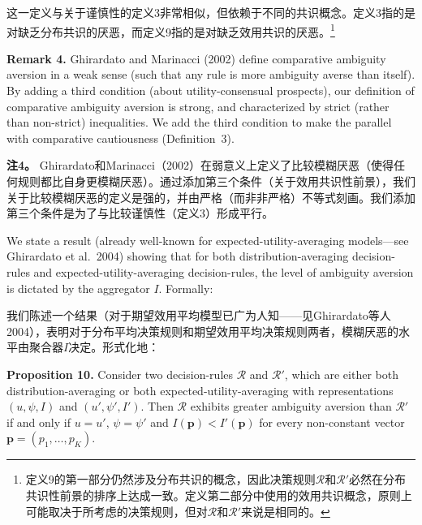 \documentclass[12pt,a4paper]{article}
\newenvironment{original}
  {\par\noindent\ignorespaces}
  {\par}
\newenvironment{translation}
  {\par\noindent{\color{transblue}\ignorespaces}}
  {\par\medskip}
\begin{document}
\begin{translation}
这一定义与关于谨慎性的定义3非常相似，但依赖于不同的共识概念。定义3指的是对缺乏分布共识的厌恶，而定义9指的是对缺乏效用共识的厌恶。\footnote{定义9的第一部分仍然涉及分布共识的概念，因此决策规则$\mathcal{R}$和$\mathcal{R}'$必然在分布共识性前景的排序上达成一致。定义第二部分中使用的效用共识概念，原则上可能取决于所考虑的决策规则，但对$\mathcal{R}$和$\mathcal{R}'$来说是相同的。}
\end{translation}

\begin{original}
\textbf{Remark 4.} Ghirardato and Marinacci (2002) define comparative ambiguity aversion in a weak sense (such that any rule is more ambiguity averse than itself). By adding a third condition (about utility-consensual prospects), our definition of comparative ambiguity aversion is strong, and characterized by strict (rather than non-strict) inequalities. We add the third condition to make the parallel with comparative cautiousness (Definition~3).
\end{original}

\begin{translation}
\textbf{注4。} Ghirardato和Marinacci（2002）在弱意义上定义了比较模糊厌恶（使得任何规则都比自身更模糊厌恶）。通过添加第三个条件（关于效用共识性前景），我们关于比较模糊厌恶的定义是强的，并由严格（而非非严格）不等式刻画。我们添加第三个条件是为了与比较谨慎性（定义3）形成平行。
\end{translation}

\begin{original}
We state a result (already well-known for expected-utility-averaging models---see Ghirardato et al.\ 2004) showing that for both distribution-averaging decision-rules and expected-utility-averaging decision-rules, the level of ambiguity aversion is dictated by the aggregator $I$. Formally:
\end{original}

\begin{translation}
我们陈述一个结果（对于期望效用平均模型已广为人知——见Ghirardato等人2004），表明对于分布平均决策规则和期望效用平均决策规则两者，模糊厌恶的水平由聚合器$I$决定。形式化地：
\end{translation}

\begin{original}
\textbf{Proposition 10.} Consider two decision-rules $\mathcal{R}$ and $\mathcal{R}'$, which are either both distribution-averaging or both expected-utility-averaging with representations $(u, \psi, I)$ and $(u', \psi', I')$. Then $\mathcal{R}$ exhibits greater ambiguity aversion than $\mathcal{R}'$ if and only if $u = u'$, $\psi = \psi'$ and $I(\mathbf{p}) < I'(\mathbf{p})$ for every non-constant vector $\mathbf{p} = (p_{1}, \dots, p_{K})$.
\end{original}
\end{document}
